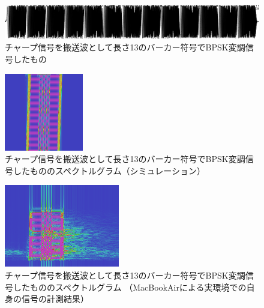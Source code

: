 \begin{figure}[p]\centering
\includegraphics[clip,width=1.0\hsize]{img/barker_chirp.png}
\caption{チャープ信号を搬送波として長さ13のバーカー符号でBPSK変調信号したもの}\label{fig:barker_chirp}
\end{figure}

\begin{figure}[p]\centering
\includegraphics[clip,width=0.75\hsize]{img/barker_coded_chirp.png}
\caption{チャープ信号を搬送波として長さ13のバーカー符号でBPSK変調信号したもののスペクトルグラム（シミュレーション）}\label{fig:barker_coded_chirp}
\end{figure}


\begin{figure}[p]\centering
\includegraphics[clip,width=0.75\hsize]{img/barker_coded_chirp_err.png}
\caption{チャープ信号を搬送波として長さ13のバーカー符号でBPSK変調信号したもののスペクトルグラム
（MacBookAirによる実環境での自身の信号の計測結果）}\label{fig:barker_coded_chirp_err}
\end{figure}



